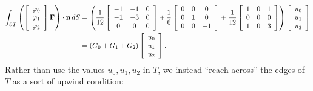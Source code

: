 \documentclass[letterpaper,10pt]{article}
\begin{document}
\begin{align*}
\int_{\partial T} \left(
\left[ \begin{array}{c}
\varphi_0 \\ \varphi_1 \\ \varphi_2 \end{array}\right]
\mathbf{F}\right) \cdot \mathbf{n} \, dS &=
\left(\frac{1}{12} \left[ \begin{array}{c c c}
-1 & -1 & 0 \\
-1 & -3 & 0 \\
 0 &  0 & 0
\end{array}\right] +
\frac{1}{6} \left[ \begin{array}{c c c}
0 & 0 &  0 \\
0 & 1 &  0 \\
0 & 0 & -1
\end{array}\right] +
\frac{1}{12} \left[ \begin{array}{c c c}
1 & 0 & 1 \\
0 & 0 & 0 \\
1 & 0 & 3
\end{array}\right]\right)
\left[ \begin{array}{c}
u_0 \\ u_1 \\ u_2 \end{array}\right] \\
&= \left(G_0 + G_1 + G_2\right)
\left[ \begin{array}{c}
u_0 \\ u_1 \\ u_2 \end{array}\right].
\end{align*}
Rather than use the values \(u_0, u_1, u_2\) in \(T\), we instead
``reach across'' the edges of \(T\) as a sort of upwind condition:
\end{document}
